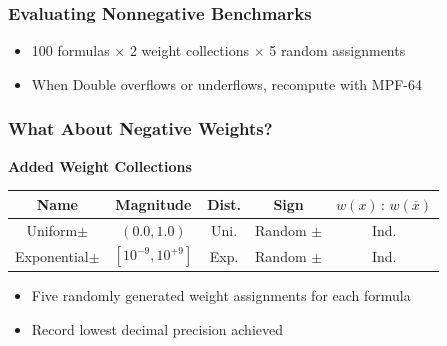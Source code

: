 \documentclass[t,pdf]{beamer}
\newcommand{\obar}[1]{\overline{#1}}
\begin{document}
\begin{frame}

\frametitle{Evaluating Nonnegative Benchmarks}

\bigskip


\medskip

\begin{itemize}
\item 100 formulas $\times$ 2 weight collections $\times$ 5 random assignments
\item When Double overflows or underflows, recompute with MPF-64
\end{itemize}

\end{frame}


\begin{frame}
  \frametitle{What About Negative Weights?}

\medskip

  \textbf{Added Weight Collections}

\begin{center}
   \begin{tabular}{ccccc}
     Name & Magnitude  & Dist. & Sign & $w(x)\,:\,w(\obar{x})$ \\
     \midrule
     Uniform$\pm$      & $(0.0, 1.0)$     & Uni.  & Random $\pm$   & Ind. \\[0.5em]
     Exponential$\pm$ & $[10^{-9}, 10^{+9}]$ & Exp. & Random $\pm$ & Ind. \\
   \end{tabular}
\end{center}

  \begin{itemize}
    \item Five randomly generated weight assignments for each formula
    \item Record lowest decimal precision achieved
  \end{itemize}

\end{frame}
\end{document}
